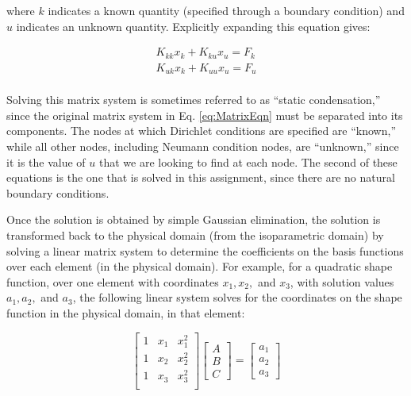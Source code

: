 \documentclass[10pt]{article}
\begin{document}
where \(k\) indicates a known quantity (specified through a boundary condition) and \(u\) indicates an unknown quantity.   Explicitly expanding this equation gives:

\begin{equation}
\begin{aligned}
K_{kk}x_k+K_{ku}x_u=F_k\\
K_{uk}x_k+K_{uu}x_u=F_u\\
\end{aligned}
\end{equation}

Solving this matrix system is sometimes referred to as ``static condensation,'' since the original matrix system in Eq. \eqref{eq:MatrixEqn} must be separated into its components. The nodes at which Dirichlet conditions are specified are ``known,'' while all other nodes, including Neumann condition nodes, are ``unknown,'' since it is the value of \(u\) that we are looking to find at each node. The second of these equations is the one that is solved in this assignment, since there are no natural boundary conditions.

Once the solution is obtained by simple Gaussian elimination, the solution is transformed back to the physical domain (from the isoparametric domain) by solving a linear matrix system to determine the coefficients on the basis functions over each element (in the physical domain). For example, for a quadratic shape function, over one element with coordinates \(x_1, x_2,\) and \(x_3\), with solution values \(a_1, a_2,\) and \(a_3\), the following linear system solves for the coordinates on the shape function in the physical domain, in that element:

\begin{equation}
\begin{bmatrix}
1 & x_1 & x_1^2\\
1 & x_2 & x_2^2\\
1 & x_3 & x_3^2\\
\end{bmatrix}
\begin{bmatrix} A\\ B\\ C
\end{bmatrix}
=
\begin{bmatrix} a_1 \\ a_2 \\ a_3
\end{bmatrix}
\end{equation}
\end{document}
